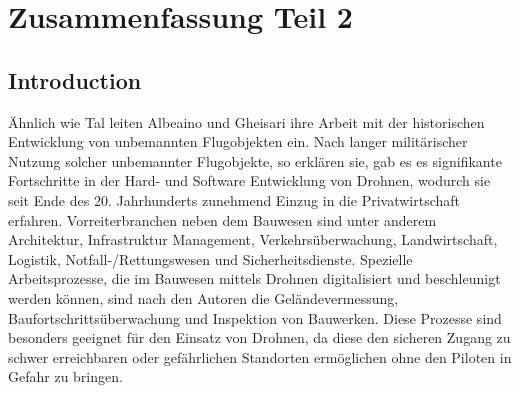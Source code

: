 \chapter{Zusammenfassung Teil 2}\label{ch:summary2}

\section{Introduction}

Ähnlich wie Tal leiten Albeaino und Gheisari ihre Arbeit mit der historischen Entwicklung von unbemannten Flugobjekten ein.
Nach langer militärischer Nutzung solcher unbemannter Flugobjekte, so erklären sie, gab es es signifikante Fortschritte in der Hard- und Software Entwicklung von Drohnen, wodurch sie seit Ende des 20. Jahrhunderts zunehmend Einzug in die Privatwirtschaft erfahren.
Vorreiterbranchen neben dem Bauwesen sind unter anderem Architektur, Infrastruktur Management, Verkehrsüberwachung, Landwirtschaft, Logistik, Notfall-/Rettungswesen und Sicherheitsdienste.
Spezielle Arbeitsprozesse, die im Bauwesen mittels Drohnen digitalisiert und beschleunigt werden können, sind nach den Autoren die Geländevermessung, Baufortschrittsüberwachung und Inspektion von Bauwerken.
Diese Prozesse sind besonders geeignet für den Einsatz von Drohnen, da diese den sicheren Zugang zu schwer erreichbaren oder gefährlichen Standorten ermöglichen ohne den Piloten in Gefahr zu bringen. \cite[S. 84--85]{abaeano2021trends}



